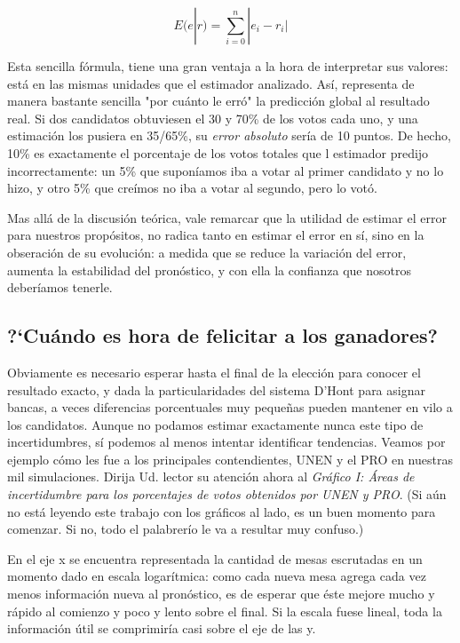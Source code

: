\documentclass[12pt, a4paper]{article}
\begin{document}
$$ E(e|r) = \sum\limits_{i=0}^{n} | e_{i} - r_{i} | $$

Esta sencilla f\'ormula, tiene una gran ventaja a la hora de interpretar sus valores: est\'a en las mismas unidades que el estimador analizado. As\'i, representa de manera bastante sencilla "por cu\'anto le err\'o" la predicci\'on global al resultado real. Si dos candidatos obtuviesen el 30 y 70\% de los votos cada uno, y una estimaci\'on los pusiera en 35/65\%, su \emph{error absoluto} ser\'ia de 10 puntos. De hecho, 10\% es exactamente el porcentaje de los votos totales que l estimador predijo incorrectamente: un 5\% que supon\'iamos iba a votar al primer candidato y no lo hizo, y otro 5\% que cre\'imos no iba a votar al segundo, pero lo vot\'o.

Mas all\'a de la discusi\'on te\'orica, vale remarcar que la utilidad de estimar el error para nuestros prop\'ositos, no radica tanto en estimar el error en s\'i, sino en la obseraci\'on de su evoluci\'on: a medida que se reduce la variaci\'on del error, aumenta la estabilidad del pron\'ostico, y con ella la confianza que nosotros deber\'iamos tenerle.

\subsection{?`Cu\'ando es hora de felicitar a los ganadores?}

Obviamente es necesario esperar hasta el final de la elecci\'on para conocer el resultado exacto, y dada la particularidades del sistema D'Hont para asignar bancas, a veces diferencias porcentuales muy peque\~nas pueden mantener en vilo a los candidatos. Aunque no podamos estimar exactamente nunca este tipo de incertidumbres, s\'i podemos al menos intentar identificar tendencias. Veamos por ejemplo c\'omo les fue a los principales contendientes, UNEN y el PRO en nuestras mil simulaciones. Dirija Ud. lector su atenci\'on ahora al \textit{Gr\'afico I: \'Areas de incertidumbre para los porcentajes de votos obtenidos por UNEN y PRO}. (Si a\'un no est\'a leyendo este trabajo con los gr\'aficos al lado, es un buen momento para comenzar. Si no, todo el palabrer\'io le va a resultar muy confuso.)

En el eje x se encuentra representada la cantidad de mesas escrutadas en un momento dado en escala logar\'itmica: como cada nueva mesa agrega cada vez menos informaci\'on nueva al pron\'ostico, es de esperar que \'este mejore mucho y r\'apido al comienzo y poco y lento sobre el final. Si la escala fuese lineal, toda la informaci\'on \'util se comprimir\'ia casi sobre el eje de las y.
\end{document}
